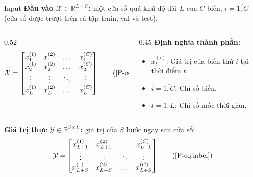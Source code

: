 \documentclass [xcolor=svgnames, notes] {beamer}
\begin{document}
\begin{frame}{Input}
    \small
    \textbf{Đầu vào $\mathcal{X} \in \mathbb{R}^{L \times C}$:} một cửa sổ quá khứ độ dài $L$ của $C$ biến,
    $i = \overline{1, C}$ (cửa sổ được trượt trên cả tập train, val và test).

    \begin{columns}[c]
        \begin{column}{0.52\textwidth}
            \[
            \mathcal{X} =
            \begin{bmatrix}
            x_1^{(1)} & x_1^{(2)} & \dots & x_1^{(C)} \\
            x_2^{(1)} & x_2^{(2)} & \dots & x_2^{(C)} \\
            \vdots & \vdots & \ddots & \vdots \\
            x_L^{(1)} & x_L^{(2)} & \dots & x_L^{(C)}
            \end{bmatrix} \tag{\ref*{P-eq:input}}\]
        \end{column}
        \begin{column}{0.45\textwidth}
            \textbf{Định nghĩa thành phần:}
            \begin{itemize}
                \setlength{\itemsep}{2pt}
                \item $x_t^{(i)}$: Giá trị của biến thứ $i$ tại thời điểm $t$.
                \item $i = \overline{1, C}$: Chỉ số biến.
                \item $t = \overline{1, L}$: Chỉ số mốc thời gian.
            \end{itemize}
        \end{column}
    \end{columns}

    \vspace{0.1cm}
    \textbf{Giá trị thực $\mathcal{Y} \in \mathbb{R}^{S \times C}$:} giá trị của $S$ bước ngay sau cửa sổ:
    \[
    \mathcal{Y} =
    \begin{bmatrix}
    x_{L+1}^{(1)} & x_{L+1}^{(2)} & \dots & x_{L+1}^{(C)} \\
    \vdots & \vdots & \ddots & \vdots \\
    x_{L+S}^{(1)} & x_{L+S}^{(2)} & \dots & x_{L+S}^{(C)}
    \end{bmatrix} \tag{\ref*{P-eq:label}}\]
\end{frame}
\end{document}
